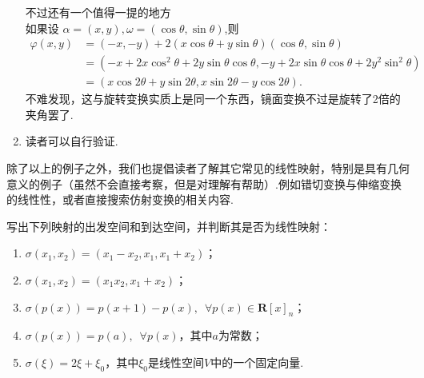 \begin{solution}
\begin{enumerate}
    不过还有一个值得一提的地方\\
    如果设 $\alpha = (x,y),\omega =(\cos \theta,\sin \theta)$,则
    \begin{align*}
        \varphi(x,y)&=(-x,-y)+2(x\cos\theta+y\sin\theta)(\cos \theta,\sin \theta)\\
        &=(-x + 2x \cos^2 \theta + 2y \sin \theta \cos \theta, -y + 2x \sin \theta \cos \theta + 2y^2 \sin^2 \theta)\\
        &=(x \cos 2\theta + y \sin 2\theta, x \sin 2\theta - y \cos 2\theta).
    \end{align*}
    不难发现，这与旋转变换实质上是同一个东西，镜面变换不过是旋转了2倍的夹角罢了.
    \item 读者可以自行验证.
    \end{enumerate}

\end{solution}

除了以上的例子之外，我们也提倡读者了解其它常见的线性映射，特别是具有几何意义的例子（虽然不会直接考察，但是对理解有帮助）.例如错切变换与伸缩变换的线性性，或者直接搜索仿射变换的相关内容.

\begin{example}{}{}
    写出下列映射的出发空间和到达空间，并判断其是否为线性映射：
    \begin{enumerate}
        \item $\sigma(x_1,x_2)=(x_1-x_2,x_1,x_1+x_2)$；

        \item $\sigma(x_1,x_2)=(x_1x_2,x_1+x_2)$；

        \item $\sigma(p(x))=p(x+1)-p(x),\enspace\forall p(x) \in \mathbf{R}[x]_n$；

        \item $\sigma(p(x))=p(a),\enspace\forall p(x)$，其中$a$为常数；

        \item $\sigma(\xi)=2\xi+\xi_0$，其中$\xi_0$是线性空间$V$中的一个固定向量.
    \end{enumerate}
\end{example}

